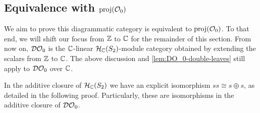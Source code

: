 
\subsection*{Equivalence with $\operatorname{proj}(\mathcal{O}_0)$}

We aim to prove this diagrammatic category is equivalent to $\operatorname{proj}(\mathcal{O}_0)$. To that end, we will shift our focus from $\mathbb{Z}$ to $\mathbb{C}$ for the remainder of this section. From now on, $\mathcal{DO}_0$ is the $\mathbb{C}$-linear $\mathcal{H}_{\mathbb{C}}(S_2)$-module category obtained by extending the scalars from $\mathbb{Z}$ to $\mathbb{C}$. The above discussion and \autoref{lem:DO_0-double-leaves} still apply to $\mathcal{DO}_0$ over $\mathbb{C}$.

\begin{lemma}
    \label{lem:ss-equal-2s}
    In the additive closure of $\mathcal{H}_{\mathbb{C}}(S_2)$ we have an explicit isomorphism $ss \cong s \oplus s$, as detailed in the following proof. Particularly, these are isomorphisms in the additive closure of $\mathcal{DO}_0$.
\end{lemma}
